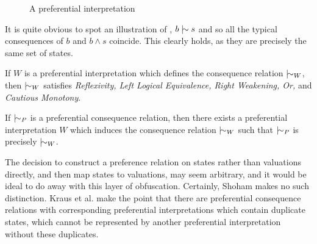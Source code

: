 \begin{example}
\begin{figure}[H]
		\caption{A preferential interpretation}
		\label{figure:preferential-interpretation}
	\end{figure}
	It is quite obvious to spot an illustration of , $b \twiddle s$ and so all the typical
	consequences of $b$ and $b \land s$ coincide. This clearly holds, as they are precisely the same set of states.
\end{example}
\begin{theorem}[Soundness]
	\label{theorem:soundness-preferential}

	If $W$ is a preferential interpretation which defines the consequence relation $\twiddle_{W}$, then $\twiddle_{W}$ satisfies
	\textit{Reflexivity, Left Logical Equivalence, Right Weakening, Or,} and \textit{Cautious Monotony}.
\end{theorem}

\begin{theorem}[Completeness]
	\label{theorem:completeness-preferential}

	If $\twiddle_{P}$ is a preferential consequence relation, then there exists a preferential interpretation $W$ which induces
	the consequence relation $\twiddle_{W}$ such that $\twiddle_{P}$ is precisely $\twiddle_{W}$.
\end{theorem}

The decision to construct a preference relation on states rather than valuations directly, and then map states to
valuations, may seem arbitrary, and it would be ideal to do away with this layer of obfuscation. Certainly, Shoham
\cite{shohamSemanticApproach} makes no such distinction. Kraus et al. \cite{kraus1990nonmonotonic} make the point that
there are preferential consequence relations with corresponding preferential interpretations which contain duplicate
states, which cannot be represented by another preferential interpretation without these duplicates.

